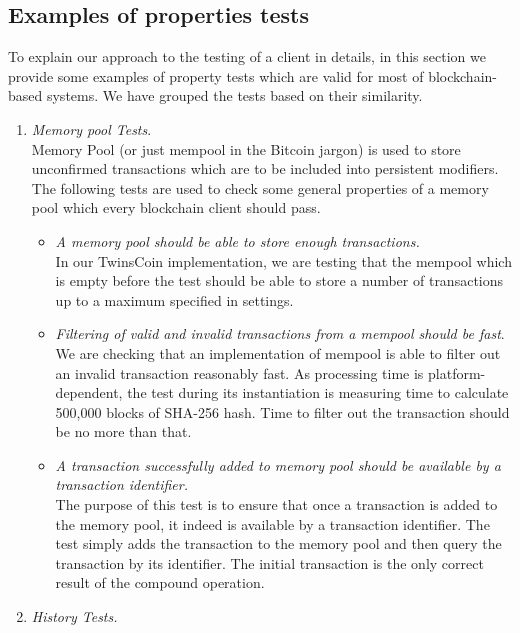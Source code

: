 
\subsection{Examples of properties tests}
\label{sec:examples}

To explain our approach to the testing of a client in details, in this section we provide some examples of property tests which are valid for most of blockchain-based systems. We have grouped the tests based on their similarity.\\

\begin{enumerate}[\IEEEsetlabelwidth{Z}]

\item \textit{Memory pool Tests}.\\
Memory Pool (or just mempool in the Bitcoin jargon) is used to store unconfirmed transactions which are to be included into persistent modifiers. The following tests are used to check some general properties of a memory pool which every blockchain client should pass.

\begin{itemize}[]

\item \textit{A memory pool should be able to store enough transactions.}\\
In our TwinsCoin implementation, we are testing that the mempool which is empty before the test should be able to store a number of transactions up to a maximum specified in settings.\\

\item \textit{Filtering of valid and invalid transactions from a mempool should be fast}.\\
We are checking that an implementation of mempool is able to filter out an invalid transaction reasonably fast. As processing time is platform-dependent, the test during its instantiation is measuring time to calculate 500,000 blocks of SHA-256 hash. Time to filter out the transaction should be no more than that. \\

\item \textit{A transaction successfully added to memory pool should be available by a transaction identifier.}\\
The purpose of this test is to ensure that once a transaction is added to the memory pool, it indeed is available by a transaction identifier. The test simply adds the transaction to the memory pool and then query the transaction by its identifier. The initial transaction is the only correct result of the compound operation. \\
\end{itemize}
\item \textit{History Tests.}\\


\end{enumerate}
